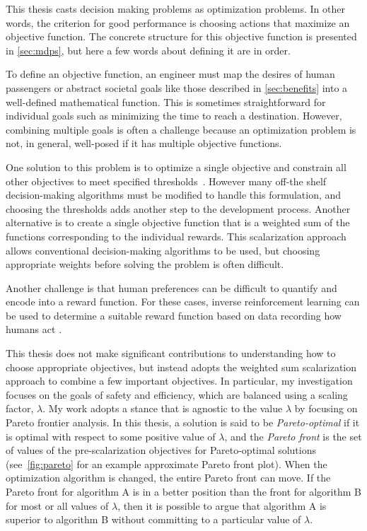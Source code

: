 
This thesis casts decision making problems as optimization problems.
In other words, the criterion for good performance is choosing actions that maximize an objective function.
The concrete structure for this objective function is presented in \cref{sec:mdps}, but here a few words about defining it are in order.

To define an objective function, an engineer must map the desires of human passengers or abstract societal goals like those described in \cref{sec:benefits} into a well-defined mathematical function.
This is sometimes straightforward for individual goals such as minimizing the time to reach a destination.
However, combining multiple goals is often a challenge because an optimization problem is not, in general, well-posed if it has multiple objective functions.

One solution to this problem is to optimize a single objective and constrain all other objectives to meet specified thresholds~\cite{EA:99}.
However many off-the shelf decision-making algorithms must be modified to handle this formulation, and choosing the thresholds adds another step to the development process.
Another alternative is to create a single objective function that is a weighted sum of the functions corresponding to the individual rewards.
This scalarization approach allows conventional decision-making algorithms to be used, but choosing appropriate weights before solving the problem is often difficult.

Another challenge is that human preferences can be difficult to quantify and encode into a reward function.
For these cases, inverse reinforcement learning can be used to determine a suitable reward function based on data recording how humans act \cite{levine2012continuous, sadigh2016leverage}.

This thesis does not make significant contributions to understanding how to choose appropriate objectives, but instead adopts the weighted sum scalarization approach to combine a few important objectives.
In particular, my investigation focuses on the goals of safety and efficiency, which are balanced using a scaling factor, $\lambda$.
My work adopts a stance that is agnostic to the value $\lambda$ by focusing on Pareto frontier analysis.
In this thesis, a solution is said to be \emph{Pareto-optimal} if it is optimal with respect to some positive value of $\lambda$, and the \emph{Pareto front} is the set of values of the pre-scalarization objectives for Pareto-optimal solutions (see~\cref{fig:pareto} for an example approximate Pareto front plot).
When the optimization algorithm is changed, the entire Pareto front can move.
If the Pareto front for algorithm A is in a better position than the front for algorithm B for most or all values of $\lambda$, then it is possible to argue that algorithm A is superior to algorithm B without committing to a particular value of $\lambda$.


